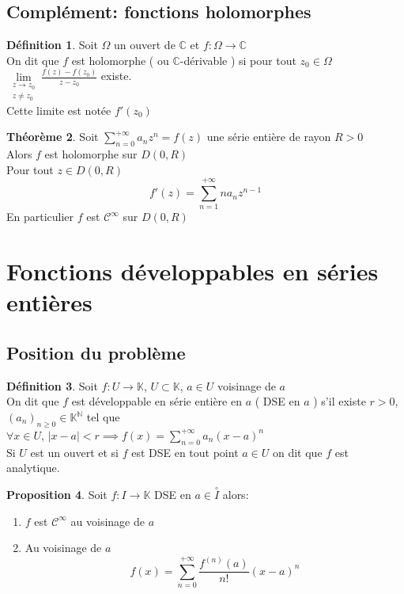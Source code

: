 \documentclass[10pt,a4paper]{article}
\theoremstyle{definition}
\newtheorem{proposition}{Proposition}[section]
\newtheorem{theorem}[proposition]{Théorème}
\newtheorem{definition}[proposition]{Définition}
\begin{document}
\subsection{Complément: fonctions holomorphes}
\begin{definition}
    Soit \(\Omega\) un ouvert de \(\mathbb{C}\) et \(f: \Omega \to \mathbb{C}\) \\
    On dit que \(f\) est holomorphe ( ou \(\mathbb{C}\)-dérivable ) si pour tout \(z_0 \in \Omega\) \(\lim\limits_{\substack{z \to z_0 \\ z \neq z_0}} \frac{f(z) - f(z_0)}{z - z_0}\) existe. \\
    Cette limite est notée \(f'(z_0)\)
\end{definition}
\begin{theorem}
    Soit \(\sum\limits_{n = 0}^{+\infty} a_n z^n = f(z)\) une série entière de rayon \(R > 0\) \\
    Alors \(f\) est holomorphe sur \(D(0, R)\) \\
    Pour tout \(z \in D(0, R)\)
    \[f'(z) = \sum_{n = 1}^{+\infty} n a_n z^{n - 1}\]
    En particulier \(f\) est \(\mathcal{C}^{\infty}\) sur \(D(0, R)\)
\end{theorem}

\section{Fonctions développables en séries entières}
\subsection{Position du problème}
\begin{definition}
    Soit \(f: U \to \mathbb{K}\), \(U \subset \mathbb{K}\), \(a \in U\) voisinage de \(a\) \\
    On dit que \(f\) est développable en série entière en \(a\) ( DSE en \(a\) ) s'il existe \(r > 0\), \((a_n)_{n \geq 0} \in \mathbb{K}^{\mathbb{N}}\) tel que  \\
    \(\forall x \in U\), \(|x - a| < r \implies f(x) = \sum\limits_{n = 0}^{+\infty} a_n (x - a)^n\) \\
    Si \(U\) est un ouvert et si \(f\) est DSE en tout point \(a \in U\) on dit que \(f\) est analytique.
\end{definition}
\begin{proposition}
    Soit \(f: I \to \mathbb{K}\) DSE en \(a \in \overset{\circ}{I}\) alors:
    \begin{enumerate}
        \item \(f\) est \(\mathcal{C}^{\infty}\) au voisinage de \(a\)
        \item Au voisinage de \(a\)
        \[\boxed{f(x) = \sum_{n = 0}^{+\infty} \frac{f^{(n)}(a)}{n!}(x - a)^n}\]
    \end{enumerate}
\end{proposition}
\end{document}
